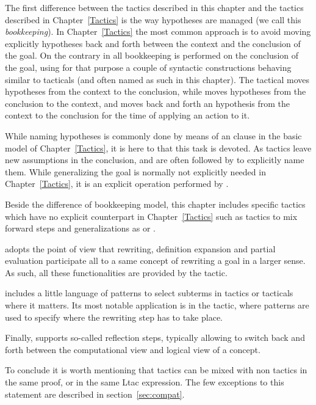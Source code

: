 The first difference between the tactics described in this
chapter and the tactics described in Chapter~\ref{Tactics} is the way
hypotheses are managed (we call this \emph{bookkeeping}).
In Chapter~\ref{Tactics} the most common
approach is to avoid moving explicitly hypotheses back and forth
between the context and the conclusion of the goal. On the contrary
in \ssr{}
all bookkeeping is performed on the conclusion of the goal, using for
that purpose a couple of syntactic constructions behaving similar to
tacticals (and often named as such in this chapter).
The \ssrC{:} tactical  moves hypotheses from the context to the
conclusion, while \ssrC{=>} moves hypotheses from the
conclusion to the context, and  moves back
and forth an hypothesis from the context to the conclusion for the
time of applying an action to it.

While naming hypotheses is commonly done by means of an 
clause in the basic model of Chapter~\ref{Tactics}, it is here to
\ssrC{=>} that this task is devoted. As tactics leave
new assumptions in the conclusion, and are often followed by
\ssrC{=>} to explicitly name them.
While generalizing the goal is normally
not explicitly needed in Chapter~\ref{Tactics}, it is an explicit
operation performed by \ssrC{:}.

Beside the difference of bookkeeping model, this chapter includes
specific tactics which have no explicit counterpart in
Chapter~\ref{Tactics} such as tactics to mix forward steps and
generalizations as  or .

\ssr{} adopts the point of view that rewriting, definition
expansion and partial evaluation participate all to a same concept of
rewriting a goal in a larger sense. As such, all these functionalities are
provided by the  tactic.

\ssr{} includes a little language of patterns to select subterms in tactics
or tacticals where it matters.  Its most notable application
is in the  tactic, where patterns are used to specify
where the rewriting step has to take place.

Finally, \ssr{} supports so-called reflection steps, typically
allowing to switch back and forth between the computational view and
logical view of a concept.

To conclude it is worth mentioning that \ssr{} tactics
can be mixed with non \ssr{} tactics in the same proof,
or in the same Ltac expression.  The few exceptions
to this statement are described in section~\ref{sec:compat}.

